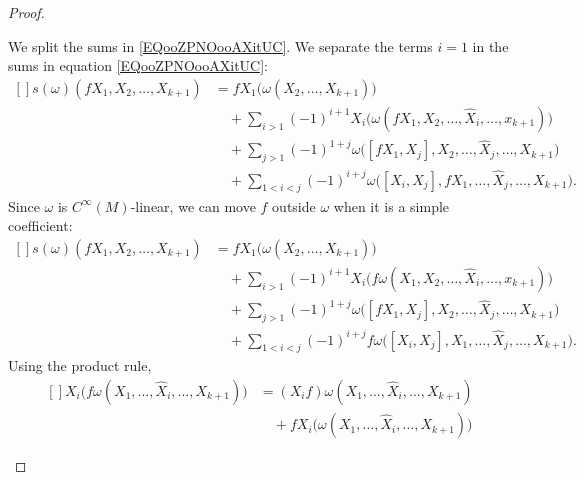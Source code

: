 \begin{proof}
\begin{subproof}
		We split the sums in \eqref{EQooZPNOooAXitUC}. We separate the terms \( i=1\) in the sums in equation \eqref{EQooZPNOooAXitUC}:
		\begin{equation}
			\begin{aligned}[]
				s(\omega)(fX_1,X_2,\ldots,X_{k+1}) & =fX_1\big( \omega(X_2,\ldots,X_{k+1}) \big)                                                   \\
				                                   & \quad +\sum_{i>1}(-1)^{i+1}X_i\big( \omega(fX_1,X_2,\ldots,\hat X_i,\ldots,x_{k+1})\big)      \\
				                                   & \quad + \sum_{j>1}(-1)^{1+j}\omega\big( [fX_1,X_j],X_2,\ldots,\hat X_j,\ldots,X_{k+1} \big)   \\
				                                   & \quad +\sum_{1<i<j}(-1)^{i+j}\omega\big( [X_i,X_j],fX_1,\ldots,\hat X_j,\ldots,X_{k+1} \big).
			\end{aligned}
		\end{equation}
		Since \( \omega\) is \( C^{\infty}(M)\)-linear, we can move \( f\) outside \( \omega\) when it is a simple coefficient:
		\begin{equation}
			\begin{aligned}[]
				s(\omega)(fX_1,X_2,\ldots,X_{k+1}) & =fX_1\big( \omega(X_2,\ldots,X_{k+1}) \big)                                                   \\
				                                   & \quad +\sum_{i>1}(-1)^{i+1}X_i\big(f \omega(X_1,X_2,\ldots,\hat X_i,\ldots,x_{k+1})\big)      \\
				                                   & \quad + \sum_{j>1}(-1)^{1+j}\omega\big( [fX_1,X_j],X_2,\ldots,\hat X_j,\ldots,X_{k+1} \big)   \\
				                                   & \quad +\sum_{1<i<j}(-1)^{i+j}f\omega\big( [X_i,X_j],X_1,\ldots,\hat X_j,\ldots,X_{k+1} \big).
			\end{aligned}
		\end{equation}
		\spitem[Apply \( X_i\)]
		Using the product rule,
		\begin{equation}
			\begin{aligned}[]
				X_i\big( f\omega(X_1,\ldots,\hat X_i,\ldots , X_{k+1}) \big) & =(X_if)\omega(X_1,\ldots,\hat X_i,\ldots,X_{k+1})                \\
				                                                             & \quad+fX_i\big( \omega(X_1,\ldots,\hat X_i,\ldots,X_{k+1}) \big)

\end{aligned}
\end{equation}
\end{subproof}
\end{proof}
